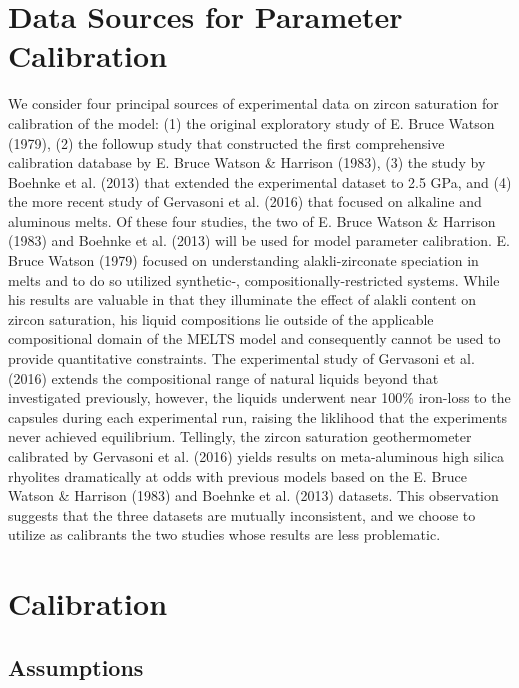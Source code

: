 \documentclass[
]{agujournal2019}
\begin{document}
\section{Data Sources for Parameter
Calibration}\label{data-sources-for-parameter-calibration}

We consider four principal sources of experimental data on zircon
saturation for calibration of the model: (1) the original exploratory
study of E. Bruce Watson (1979), (2) the followup study that constructed
the first comprehensive calibration database by E. Bruce Watson \&
Harrison (1983), (3) the study by Boehnke et al. (2013) that extended
the experimental dataset to 2.5 GPa, and (4) the more recent study of
Gervasoni et al. (2016) that focused on alkaline and aluminous melts. Of
these four studies, the two of E. Bruce Watson \& Harrison (1983) and
Boehnke et al. (2013) will be used for model parameter calibration. E.
Bruce Watson (1979) focused on understanding alakli-zirconate speciation
in melts and to do so utilized synthetic-, compositionally-restricted
systems. While his results are valuable in that they illuminate the
effect of alakli content on zircon saturation, his liquid compositions
lie outside of the applicable compositional domain of the MELTS model
and consequently cannot be used to provide quantitative constraints. The
experimental study of Gervasoni et al. (2016) extends the compositional
range of natural liquids beyond that investigated previously, however,
the liquids underwent near 100\% iron-loss to the capsules during each
experimental run, raising the liklihood that the experiments never
achieved equilibrium. Tellingly, the zircon saturation geothermometer
calibrated by Gervasoni et al. (2016) yields results on meta-aluminous
high silica rhyolites dramatically at odds with previous models based on
the E. Bruce Watson \& Harrison (1983) and Boehnke et al. (2013)
datasets. This observation suggests that the three datasets are mutually
inconsistent, and we choose to utilize as calibrants the two studies
whose results are less problematic.

\section{Calibration}\label{calibration}

\subsection{Assumptions}\label{assumptions}
\end{document}
